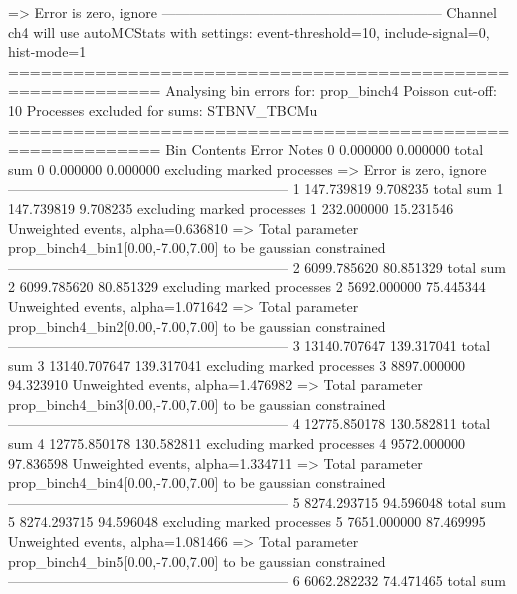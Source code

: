   => Error is zero, ignore      
------------------------------------------------------------
Channel ch4 will use autoMCStats with settings: event-threshold=10, include-signal=0, hist-mode=1
============================================================
Analysing bin errors for: prop_binch4
Poisson cut-off: 10
Processes excluded for sums: STBNV_TBCMu
============================================================
Bin        Contents        Error           Notes                         
0          0.000000        0.000000        total sum                     
0          0.000000        0.000000        excluding marked processes    
  => Error is zero, ignore      
------------------------------------------------------------
1          147.739819      9.708235        total sum                     
1          147.739819      9.708235        excluding marked processes    
1          232.000000      15.231546       Unweighted events, alpha=0.636810
  => Total parameter prop_binch4_bin1[0.00,-7.00,7.00] to be gaussian constrained
------------------------------------------------------------
2          6099.785620     80.851329       total sum                     
2          6099.785620     80.851329       excluding marked processes    
2          5692.000000     75.445344       Unweighted events, alpha=1.071642
  => Total parameter prop_binch4_bin2[0.00,-7.00,7.00] to be gaussian constrained
------------------------------------------------------------
3          13140.707647    139.317041      total sum                     
3          13140.707647    139.317041      excluding marked processes    
3          8897.000000     94.323910       Unweighted events, alpha=1.476982
  => Total parameter prop_binch4_bin3[0.00,-7.00,7.00] to be gaussian constrained
------------------------------------------------------------
4          12775.850178    130.582811      total sum                     
4          12775.850178    130.582811      excluding marked processes    
4          9572.000000     97.836598       Unweighted events, alpha=1.334711
  => Total parameter prop_binch4_bin4[0.00,-7.00,7.00] to be gaussian constrained
------------------------------------------------------------
5          8274.293715     94.596048       total sum                     
5          8274.293715     94.596048       excluding marked processes    
5          7651.000000     87.469995       Unweighted events, alpha=1.081466
  => Total parameter prop_binch4_bin5[0.00,-7.00,7.00] to be gaussian constrained
------------------------------------------------------------
6          6062.282232     74.471465       total sum                     
